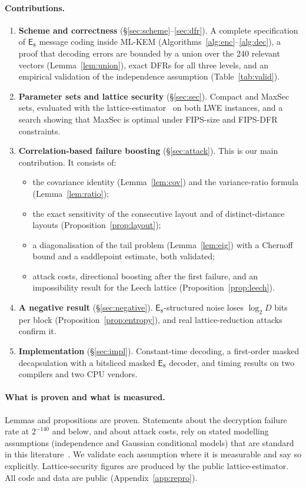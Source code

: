 \documentclass[11pt,a4paper]{article}
\theoremstyle{definition}
\theoremstyle{remark}
\newcommand{\E}{\mathsf{E}_8}
\newcommand{\lt}{\log_2}
\begin{document}
\paragraph{Contributions.}
\begin{enumerate}[leftmargin=*,itemsep=2pt]
\item \textbf{Scheme and correctness} (\S\ref{sec:scheme}--\ref{sec:dfr}). A complete specification of $\E$ message coding inside ML-KEM (Algorithms~\ref{alg:enc}--\ref{alg:dec}), a proof that decoding errors are bounded by a union over the 240 relevant vectors (Lemma~\ref{lem:union}), exact DFRs for all three levels, and an empirical validation of the independence assumption (Table~\ref{tab:valid}).
\item \textbf{Parameter sets and lattice security} (\S\ref{sec:sec}). Compact and MaxSec sets, evaluated with the lattice-estimator~\cite{estimator} on both LWE instances, and a search showing that MaxSec is optimal under FIPS-size and FIPS-DFR constraints.
\item \textbf{Correlation-based failure boosting} (\S\ref{sec:attack}). This is our main contribution. It consists of:
\begin{itemize}[itemsep=1pt]
\item the covariance identity (Lemma~\ref{lem:cov}) and the variance-ratio formula (Lemma~\ref{lem:ratio});
\item the exact sensitivity of the consecutive layout and of distinct-distance layouts (Proposition~\ref{prop:layout});
\item a diagonalisation of the tail problem (Lemma~\ref{lem:eig}) with a Chernoff bound and a saddlepoint estimate, both validated;
\item attack costs, directional boosting after the first failure, and an impossibility result for the Leech lattice (Proposition~\ref{prop:leech}).
\end{itemize}
\item \textbf{A negative result} (\S\ref{sec:negative}). $\E$-structured noise loses $\lt D$ bits per block (Proposition~\ref{prop:entropy}), and real lattice-reduction attacks confirm it.
\item \textbf{Implementation} (\S\ref{sec:impl}). Constant-time decoding, a first-order masked decapsulation with a bitsliced masked $\E$ decoder, and timing results on two compilers and two CPU vendors.
\end{enumerate}

\paragraph{What is proven and what is measured.} Lemmas and propositions are proven. Statements about the decryption failure rate at $2^{-140}$ and below, and about attack costs, rely on stated modelling assumptions (independence and Gaussian conditional models) that are standard in this literature~\cite{kyber,danvers19}. We validate each assumption where it is measurable and say so explicitly. Lattice-security figures are produced by the public lattice-estimator. All code and data are public (Appendix~\ref{app:repro}).
\end{document}
